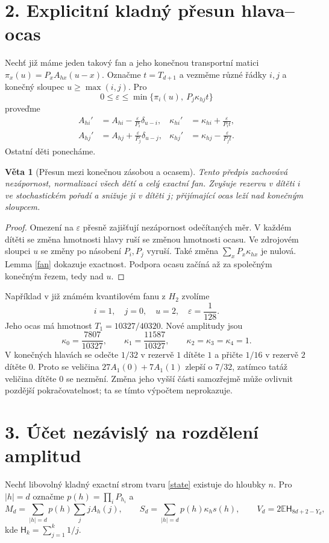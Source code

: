 \documentclass[11pt,a4paper]{article}
\newtheorem{theorem}{Věta}
\newcommand{\E}{\mathbb E}
\newcommand{\HH}{\mathsf H}
\begin{document}
\section*{2. Explicitní kladný přesun hlava--ocas}
Nechť již máme jeden takový fan a jeho konečnou transportní matici
$\pi_x(u)=P_xA_{hx}(u-x)$. Označme $t=T_{d+1}$ a vezměme různé řádky
$i,j$ a konečný sloupec $u\ge\max(i,j)$. Pro
\[
 0\le\varepsilon\le
 \min\{\pi_i(u),\ P_j\kappa_{hj}t\}
\]
proveďme
\begin{align*}
 A_{hi}'&=A_{hi}-\frac{\varepsilon}{P_i}\delta_{u-i},&
 \kappa_{hi}'&=\kappa_{hi}+\frac{\varepsilon}{P_it},\\
 A_{hj}'&=A_{hj}+\frac{\varepsilon}{P_j}\delta_{u-j},&
 \kappa_{hj}'&=\kappa_{hj}-\frac{\varepsilon}{P_jt}.
\end{align*}
Ostatní děti ponecháme.

\begin{theorem}[Přesun mezi konečnou zásobou a ocasem]\label{exchange}
Tento předpis zachovává nezápornost, normalizaci všech dětí a celý
exactní fan. Zvyšuje rezervu v dítěti $i$ ve stochastickém pořadí a
snižuje ji v dítěti $j$; přijímající ocas leží nad konečným sloupcem.
\end{theorem}
\begin{proof}
Omezení na $\varepsilon$ přesně zajišťují nezápornost odečítaných měr.
V každém dítěti se změna hmotnosti hlavy ruší se změnou hmotnosti ocasu.
Ve zdrojovém sloupci $u$ se změny po násobení $P_i,P_j$ vyruší.
Také změna $\sum_xP_x\kappa_{hx}$ je nulová.
Lemma \ref{fan} dokazuje exactnost. Podpora ocasu začíná až za
společným konečným řezem, tedy nad $u$.
\end{proof}

Například v již známém kvantilovém fanu z $H_2$ zvolíme
\[
 i=1,\quad j=0,\quad u=2,\quad\varepsilon=\frac1{128}.
\]
Jeho ocas má hmotnost $T_1=10327/40320$. Nové amplitudy jsou
\[
 \boxed{\kappa_0=\frac{7807}{10327},\qquad
 \kappa_1=\frac{11587}{10327},\qquad
 \kappa_2=\kappa_3=\kappa_4=1.}
\]
V konečných hlavách se odečte $1/32$ v rezervě $1$ dítěte $1$ a přičte
$1/16$ v rezervě $2$ dítěte $0$. Proto se veličina
$27A_1(0)+7A_1(1)$ zlepší o $7/32$, zatímco tatáž veličina dítěte $0$
se nezmění. Změna jeho vyšší části samozřejmě může ovlivnit pozdější
pokračovatelnost; ta se tímto výpočtem neprokazuje.

\section*{3. Účet nezávislý na rozdělení amplitud}
Nechť libovolný kladný exactní strom tvaru \eqref{state} existuje do
hloubky $n$. Pro $|h|=d$ označme $p(h)=\prod_iP_{h_i}$ a
\[
 M_d=\sum_{|h|=d}p(h)\sum_j jA_h(j),\qquad
 S_d=\sum_{|h|=d}p(h)\kappa_hs(h),\qquad
 V_d=2\E\HH_{8d+2-Y_d},
\]
kde $\HH_k=\sum_{j=1}^k1/j$.
\end{document}
